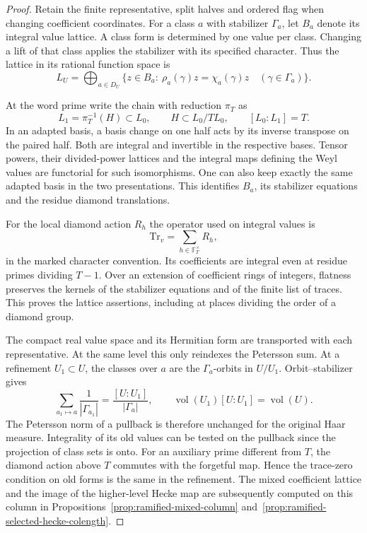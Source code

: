 \begin{proof}
Retain the finite representative, split halves and ordered flag when
changing coefficient coordinates. For a class \(a\) with stabilizer
\(\Gamma_a\), let \(B_a\) denote its integral value lattice.
A class form is determined by one value per class. Changing a lift of
that class applies the stabilizer with its specified character. Thus
the lattice in its rational function space is
\[
 L_U=\bigoplus_{a\in D_U}
  \{z\in B_a:\ \rho_a(\gamma)z=\chi_a(\gamma)z
                              \quad(\gamma\in\Gamma_a)\}.
\]

At the word prime write the chain with reduction \(\pi_T\) as
\[
   L_1=\pi_T^{-1}(H)\subset L_0,\qquad
       H\subset L_0/T L_0,\qquad [L_0:L_1]=T .
\] In an adapted basis, a basis change on
one half acts by its inverse transpose on the paired half. Both are
integral and invertible in the respective bases. Tensor powers,
their divided-power lattices and the integral maps defining the Weyl
values are functorial for such isomorphisms. One can also keep exactly
the same adapted basis in the two presentations. This identifies
\(B_a\), its stabilizer equations and the residue diamond translations.

For the local diamond action \(R_h\) the operator used on integral values is
\[
              \mathrm{Tr}_v=\sum_{h\in\mathbb F_T^\times} R_h ,
\]
in the marked character convention. Its coefficients are integral even at residue primes dividing \(T-1\). Over an extension of coefficient rings of
integers, flatness preserves the kernels of the stabilizer equations
and of the finite list of traces. This proves the lattice assertions,
including at places dividing the order of a diamond group.

The compact real value space and its Hermitian form are transported
with each representative. At the same level this only reindexes the
Petersson sum. At a refinement \(U_1\subset U\), the classes over
\(a\) are the \(\Gamma_a\)-orbits in \(U/U_1\). Orbit--stabilizer gives
\[
 \sum_{a_1\mapsto a}\frac{1}{|\Gamma_{a_1}|}
             =\frac{[U:U_1]}{|\Gamma_a|},\qquad
 \operatorname{vol}(U_1)[U:U_1]=\operatorname{vol}(U).
\]
The Petersson norm of a pullback is therefore unchanged for the
original Haar measure. Integrality of its old values can be tested on
the pullback since the projection of class sets is onto. For an
auxiliary prime different from \(T\), the diamond action above \(T\)
commutes with the forgetful map. Hence the trace-zero condition on
old forms is the same in the refinement. The mixed coefficient
lattice and the image of the higher-level Hecke map are subsequently
computed on this column in Propositions~\ref{prop:ramified-mixed-column}
and~\ref{prop:ramified-selected-hecke-colength}.
\end{proof}

